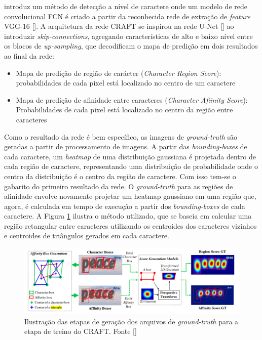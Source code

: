 \citeauthor{CRAFT} introduz um método de detecção a nível de caractere onde um modelo de rede convolucional FCN é criado a partir da reconhecida rede de extração de \textit{feature} VGG-16 []. A arquitetura da rede CRAFT se inspirou na rede U-Net [] ao introduzir \textit{skip-connections}, agregando características de alto e baixo nível entre os blocos de \textit{up-sampling}, que decodificam o mapa de predição em dois resultados ao final da rede:

\begin{itemize}
    \item {Mapa de predição de região de carácter (\textit{Character Region Score}): probabilidades de cada pixel está localizado no centro de um caractere}
    \item {Mapa de predição de afinidade entre caracteres (\textit{Character Afiinity Score}): Probabilidades de cada  pixel está localizado no centro da região entre caracteres}
\end{itemize}

Como o resultado da rede é bem específico, as imagens de \textit{ground-truth} são geradas a partir de processamento de imagens. A partir das \textit{bounding-boxes} de cada caractere, um \textit{heatmap} de uma distribuição gaussiana é projetada dentro de cada região de caractere, representando uma distribuição de probabilidade onde o centro da distribuição é o centro da região de caractere. Com isso tem-se o gabarito do primeiro resultado da rede. O \textit{ground-truth} para as regiões de afinidade envolve novamente projetar um heatmap gaussiano em uma região que, agora, é calculada em tempo de execução a partir dos \textit{bounding-boxes} de cada caractere. A Figura \ref{fig:craft_gt}  ilustra o método utilizado, que se baseia em calcular uma região retangular entre caracteres utilizando os centroides dos caracteres vizinhos e centroides de triângulos gerados em cada caractere.

\begin{figure}
    \centering
    \includegraphics[width=\textwidth]{figs/craft-gt.png}
    \caption{Ilustração das etapas de geração dos arquivos de \textit{ground-truth} para a etapa de treino do CRAFT. Fonte []}
    \label{fig:craft_gt}
\end{figure}

